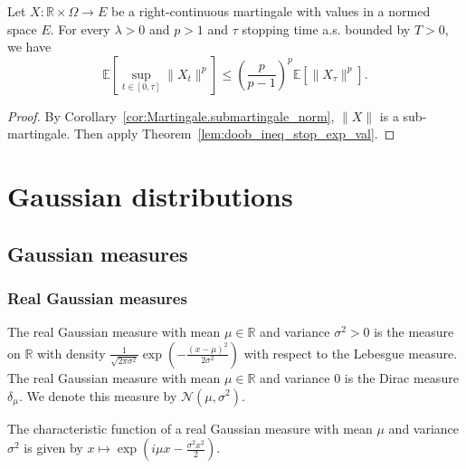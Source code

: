 \begin{corollary}\label{cor:doob_ineq_stop_exp_val}
  Let $X:\mathbb{R}\times\Omega\rightarrow E$ be a right-continuous martingale with values in a normed space $E$.
  For every $\lambda>0$ and $p>1$ and $\tau$ stopping time a.s. bounded by $T>0$, we have
  $$
  \mathbb{E}\left[ \sup_{t\in[0,\tau]}\lVert X_t \rVert^p \right]\leq \left(\frac{p}{p-1}\right)^p\mathbb{E}[\lVert X_\tau \rVert^p].
  $$
\end{corollary}
\begin{proof}
  By Corollary~\ref{cor:Martingale.submartingale_norm}, $\lVert X \rVert$ is a sub-martingale.
  Then apply Theorem~\ref{lem:doob_ineq_stop_exp_val}.
\end{proof}


\chapter{Gaussian distributions}
\label{chap:gaussian}

\section{Gaussian measures}
\label{sec:gaussian_measures}

\subsection{Real Gaussian measures}

\begin{definition}\label{def:gaussianReal}
  \mathlibok
  The real Gaussian measure with mean $\mu \in \mathbb{R}$ and variance $\sigma^2 > 0$ is the measure on $\mathbb{R}$ with density $\frac{1}{\sqrt{2 \pi \sigma^2}} \exp\left(-\frac{(x - \mu)^2}{2 \sigma^2}\right)$ with respect to the Lebesgue measure.
  The real Gaussian measure with mean $\mu \in \mathbb{R}$ and variance $0$ is the Dirac measure $\delta_\mu$.
  We denote this measure by $\mathcal{N}(\mu, \sigma^2)$.
\end{definition}


\begin{lemma}\label{lem:charFun_gaussianReal}
  \mathlibok
The characteristic function of a real Gaussian measure with mean $\mu$ and variance $\sigma^2$ is given by
$x \mapsto \exp\left(i \mu x - \frac{\sigma^2 x^2}{2}\right)$.
\end{lemma}

